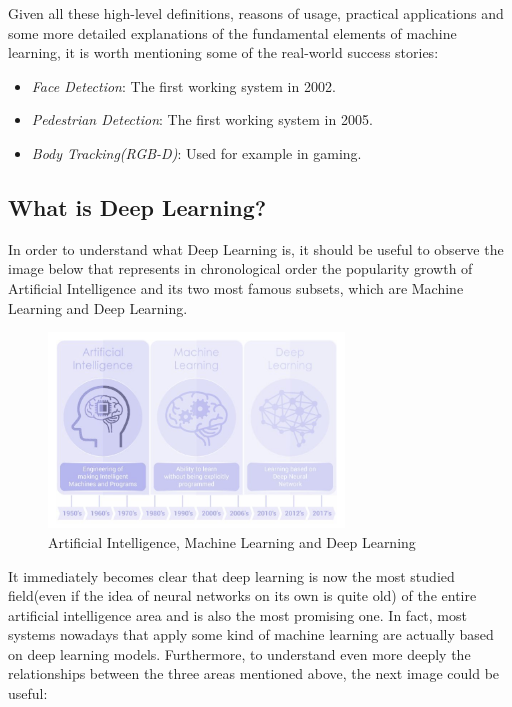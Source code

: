 \vspace{5mm}

Given all these high-level definitions, reasons of usage, practical
applications and some more detailed explanations of the fundamental
elements of machine learning, it is worth mentioning some of the
real-world success stories:

\begin{itemize}
    \item \emph{Face Detection}: The first working system in 2002.
    \item \emph{Pedestrian Detection}: The first working system in 2005.
    \item \emph{Body Tracking(RGB-D)}: Used for example in gaming.
\end{itemize}

\newpage

\subsection{What is Deep Learning?}

In order to understand what Deep Learning is, it should be useful to
observe the image below that represents in chronological order the
popularity growth of Artificial Intelligence and its two most famous
subsets, which are Machine Learning and Deep Learning.

\begin{figure}[h]
    \centering
    \includegraphics[width=0.7\textwidth]{../img/AI_ML_DL_1}
    \caption{Artificial Intelligence, Machine Learning and Deep Learning}
\end{figure}

It immediately becomes clear that deep learning is now the most
studied field(even if the idea of neural networks on its own is quite
old) of the entire artificial intelligence area and is also the
most promising one. In fact, most systems nowadays that apply some
kind of machine learning are actually based on deep learning models.
Furthermore, to understand even more deeply the relationships between
the three areas mentioned above, the next image could be useful:

